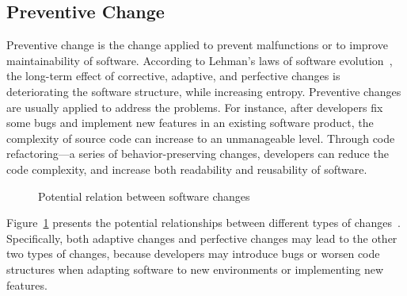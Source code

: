 \documentclass[runningheads,a4paper]{llncs}
\begin{document}
\subsection{Preventive Change}
Preventive change is the change applied to prevent malfunctions or to improve maintainability of software. 
According to Lehman's laws of software evolution~\cite{Lehman1984:ULE}, the long-term effect of corrective, adaptive, and perfective changes is deteriorating the software structure, while increasing entropy. Preventive changes are usually applied to address the problems. For instance, after developers fix some bugs and implement new features in an existing software product, the complexity of source code can increase to an unmanageable level. Through code refactoring---a series of behavior-preserving changes, developers can reduce the code complexity, and increase both readability and reusability of software.
\begin{figure}[!htb]
\centering
{}
\caption{Potential relation between software changes~\cite{Seaman2008:SMC}}
\label{fig:relation}
\end{figure}

Figure~\ref{fig:relation} presents the potential relationships between different types of changes~\cite{Seaman2008:SMC}. Specifically, both adaptive changes and perfective changes may lead to the other two types of changes, because developers may introduce bugs or worsen code structures when adapting software to new environments or implementing new features.
\end{document}
